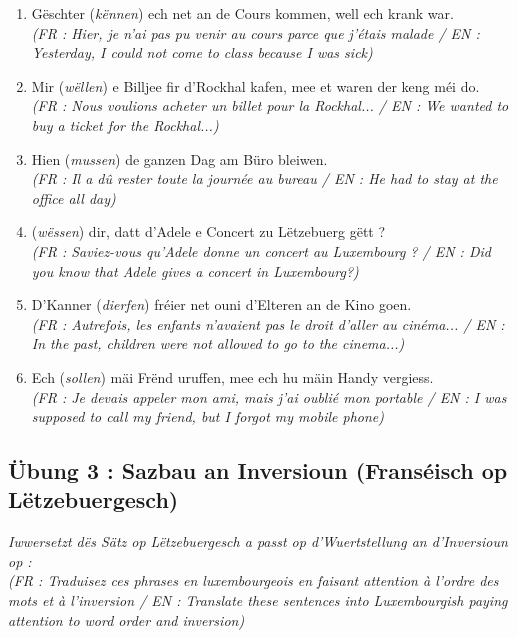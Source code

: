 \begin{enumerate}
    \item Gëschter (\textit{kënnen}) ech net an de Cours kommen, well ech krank war. \\
    \small\textit{(FR : Hier, je n'ai pas pu venir au cours parce que j'étais malade / EN : Yesterday, I could not come to class because I was sick)}
    \item Mir (\textit{wëllen}) e Billjee fir d'Rockhal kafen, mee et waren der keng méi do. \\
    \small\textit{(FR : Nous voulions acheter un billet pour la Rockhal... / EN : We wanted to buy a ticket for the Rockhal...)}
    \item Hien (\textit{mussen}) de ganzen Dag am Büro bleiwen. \\
    \small\textit{(FR : Il a dû rester toute la journée au bureau / EN : He had to stay at the office all day)}
    \item (\textit{wëssen}) dir, datt d'Adele e Concert zu Lëtzebuerg gëtt ? \\
    \small\textit{(FR : Saviez-vous qu'Adele donne un concert au Luxembourg ? / EN : Did you know that Adele gives a concert in Luxembourg?)}
    \item D'Kanner (\textit{dierfen}) fréier net ouni d'Elteren an de Kino goen. \\
    \small\textit{(FR : Autrefois, les enfants n'avaient pas le droit d'aller au cinéma... / EN : In the past, children were not allowed to go to the cinema...)}
    \item Ech (\textit{sollen}) mäi Frënd uruffen, mee ech hu mäin Handy vergiess. \\
    \small\textit{(FR : Je devais appeler mon ami, mais j'ai oublié mon portable / EN : I was supposed to call my friend, but I forgot my mobile phone)}
\end{enumerate}

\subsection*{Übung 3 : Sazbau an Inversioun (Franséisch op Lëtzebuergesch)}
\textit{Iwwersetzt dës Sätz op Lëtzebuergesch a passt op d'Wuertstellung an d'Inversioun op :} \\
\textit{\small(FR : Traduisez ces phrases en luxembourgeois en faisant attention à l'ordre des mots et à l'inversion / EN : Translate these sentences into Luxembourgish paying attention to word order and inversion)}

